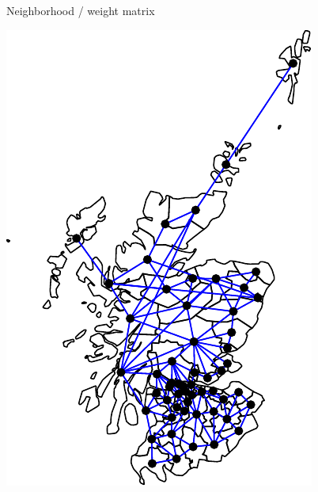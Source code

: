 \documentclass[11pt,ignorenonframetext,]{beamer}
\begin{document}
\begin{frame}{Neighborhood / weight matrix}

\vspace{-4mm}

\begin{center}\includegraphics[height=\textheight]{Lec20_files/figure-beamer/unnamed-chunk-3-1} \end{center}

\end{frame}
\end{document}
